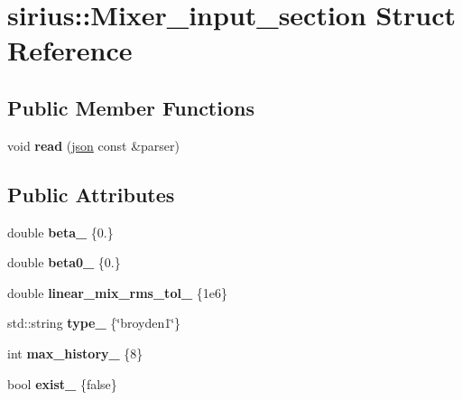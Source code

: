 \hypertarget{structsirius_1_1_mixer__input__section}{}\section{sirius\+:\+:Mixer\+\_\+input\+\_\+section Struct Reference}
\label{structsirius_1_1_mixer__input__section}
\subsection*{Public Member Functions}
\begin{DoxyCompactItemize}
\item 
\hypertarget{structsirius_1_1_mixer__input__section_a32c268b36caf2e20de956e5cc050023f}{}void {\bfseries read} (\hyperlink{classnlohmann_1_1basic__json}{json} const \&parser)\label{structsirius_1_1_mixer__input__section_a32c268b36caf2e20de956e5cc050023f}

\end{DoxyCompactItemize}
\subsection*{Public Attributes}
\begin{DoxyCompactItemize}
\item 
\hypertarget{structsirius_1_1_mixer__input__section_a66cb4c6a930ecd57e616cff38124344f}{}double {\bfseries beta\+\_\+} \{0.\}\label{structsirius_1_1_mixer__input__section_a66cb4c6a930ecd57e616cff38124344f}

\item 
\hypertarget{structsirius_1_1_mixer__input__section_a7333fb18d81a29234cb35291c02c176c}{}double {\bfseries beta0\+\_\+} \{0.\}\label{structsirius_1_1_mixer__input__section_a7333fb18d81a29234cb35291c02c176c}

\item 
\hypertarget{structsirius_1_1_mixer__input__section_a9669a8f96440557fea24867034e7f499}{}double {\bfseries linear\+\_\+mix\+\_\+rms\+\_\+tol\+\_\+} \{1e6\}\label{structsirius_1_1_mixer__input__section_a9669a8f96440557fea24867034e7f499}

\item 
\hypertarget{structsirius_1_1_mixer__input__section_ac8cc690ce52e7fedd531f8368df3dd87}{}std\+::string {\bfseries type\+\_\+} \{\char`\"{}broyden1\char`\"{}\}\label{structsirius_1_1_mixer__input__section_ac8cc690ce52e7fedd531f8368df3dd87}

\item 
\hypertarget{structsirius_1_1_mixer__input__section_a29c828061c73d90910cc420e11d29e0e}{}int {\bfseries max\+\_\+history\+\_\+} \{8\}\label{structsirius_1_1_mixer__input__section_a29c828061c73d90910cc420e11d29e0e}

\item 
\hypertarget{structsirius_1_1_mixer__input__section_a8b945574e1029a73d3604dc82a51a8ef}{}bool {\bfseries exist\+\_\+} \{false\}\label{structsirius_1_1_mixer__input__section_a8b945574e1029a73d3604dc82a51a8ef}

\end{DoxyCompactItemize}


